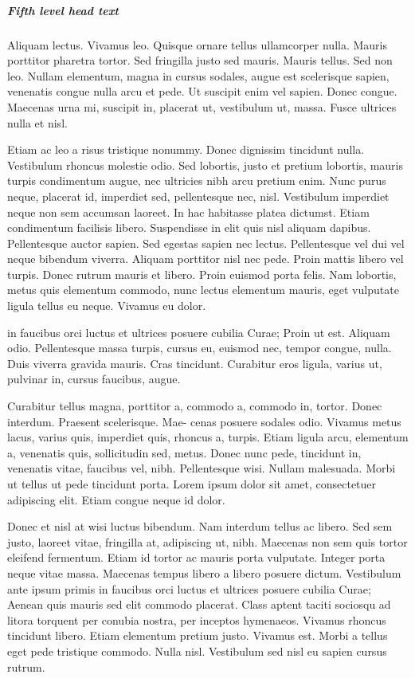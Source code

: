 \documentclass[AMS,STIX2COL]{WileyNJD-v2}
\begin{document}
    \subparagraph{Fifth level head text}

    Aliquam lectus. Vivamus leo. Quisque ornare tellus ullamcorper nulla. Mauris porttitor pharetra
    tortor. Sed fringilla justo sed mauris. Mauris tellus. Sed non leo. Nullam elementum, magna in cursus sodales, augue
    est scelerisque sapien, venenatis congue nulla arcu et pede. Ut suscipit enim vel sapien. Donec congue. Maecenas
    urna mi, suscipit in, placerat ut, vestibulum ut, massa. Fusce ultrices nulla et nisl.

    Etiam ac leo a risus tristique nonummy. Donec dignissim tincidunt nulla. Vestibulum rhoncus molestie odio. Sed
    lobortis, justo et pretium lobortis, mauris turpis condimentum augue, nec ultricies nibh arcu pretium enim. Nunc
    purus neque, placerat id, imperdiet sed, pellentesque nec, nisl. Vestibulum imperdiet neque non sem accumsan laoreet.
    In hac habitasse platea dictumst. Etiam condimentum facilisis libero. Suspendisse in elit quis nisl aliquam dapibus.
    Pellentesque auctor sapien. Sed egestas sapien nec lectus. Pellentesque vel dui vel neque bibendum viverra. Aliquam
    porttitor nisl nec pede. Proin mattis libero vel turpis. Donec rutrum mauris et libero. Proin euismod porta felis.
    Nam lobortis, metus quis elementum commodo, nunc lectus elementum mauris, eget vulputate ligula tellus eu neque.
    Vivamus eu dolor.

    in faucibus orci luctus et ultrices posuere cubilia Curae; Proin ut est. Aliquam odio. Pellentesque massa turpis, cursus
    eu, euismod nec, tempor congue, nulla. Duis viverra gravida mauris. Cras tincidunt. Curabitur eros ligula, varius ut,
    pulvinar in, cursus faucibus, augue.

    Curabitur tellus magna, porttitor a, commodo a, commodo in, tortor. Donec interdum. Praesent scelerisque. Mae-
    cenas posuere sodales odio. Vivamus metus lacus, varius quis, imperdiet quis, rhoncus a, turpis. Etiam ligula arcu,
    elementum a, venenatis quis, sollicitudin sed, metus. Donec nunc pede, tincidunt in, venenatis vitae, faucibus vel,
    nibh. Pellentesque wisi. Nullam malesuada. Morbi ut tellus ut pede tincidunt porta. Lorem ipsum dolor sit amet,
    consectetuer adipiscing elit. Etiam congue neque id dolor.

    Donec et nisl at wisi luctus bibendum. Nam interdum tellus ac libero. Sed sem justo, laoreet vitae, fringilla at,
    adipiscing ut, nibh. Maecenas non sem quis tortor eleifend fermentum. Etiam id tortor ac mauris porta vulputate.
    Integer porta neque vitae massa. Maecenas tempus libero a libero posuere dictum. Vestibulum ante ipsum primis in
    faucibus orci luctus et ultrices posuere cubilia Curae; Aenean quis mauris sed elit commodo placerat. Class aptent
    taciti sociosqu ad litora torquent per conubia nostra, per inceptos hymenaeos. Vivamus rhoncus tincidunt libero.
    Etiam elementum pretium justo. Vivamus est. Morbi a tellus eget pede tristique commodo. Nulla nisl. Vestibulum
    sed nisl eu sapien cursus rutrum.
\end{document}
